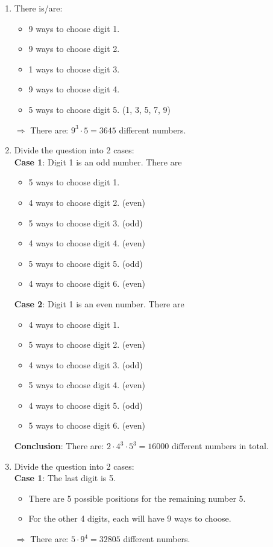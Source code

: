\documentclass[10pt]{article}
\begin{document}
\begin{enumerate}
    \item There is/are:
        \begin{itemize}
            \item 9 ways to choose digit 1.
            \item 9 ways to choose digit 2.
            \item 1 ways to choose digit 3.
            \item 9 ways to choose digit 4.
            \item 5 ways to choose digit 5. (1, 3, 5, 7, 9)
        \end{itemize}
        $\Rightarrow$ There are: $9^{3} \cdot 5 = 3645$ different numbers.

    \item Divide the question into 2 cases: \\
        \textbf{Case 1}: Digit 1 is an odd number. There are
        \begin{itemize}
            \item 5 ways to choose digit 1.
            \item 4 ways to choose digit 2. (even)
            \item 5 ways to choose digit 3. (odd)
            \item 4 ways to choose digit 4. (even)
            \item 5 ways to choose digit 5. (odd)
            \item 4 ways to choose digit 6. (even)
        \end{itemize}
        \textbf{Case 2}: Digit 1 is an even number. There are
        \begin{itemize}
            \item 4 ways to choose digit 1.
            \item 5 ways to choose digit 2. (even)
            \item 4 ways to choose digit 3. (odd)
            \item 5 ways to choose digit 4. (even)
            \item 4 ways to choose digit 5. (odd)
            \item 5 ways to choose digit 6. (even)
        \end{itemize}
        \textbf{Conclusion}: There are: $2 \cdot 4^{3} \cdot 5^{3} = 16000$ different numbers
        in total.

    \item Divide the question into 2 cases: \\
        \textbf{Case 1}: The last digit is 5.
        \begin{itemize}
            \item There are 5 possible positions for the remaining number 5.
            \item For the other 4 digits, each will have 9 ways to choose.
        \end{itemize}
        $\Rightarrow$ There are: $5 \cdot 9^{4} = 32805$ different numbers. \\


\end{enumerate}
\end{document}
